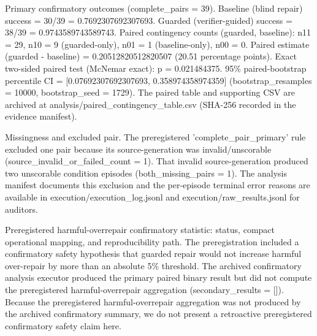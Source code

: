 \documentclass[conference]{IEEEtran}
\begin{document}
Primary confirmatory outcomes (complete\_pairs = 39). Baseline (blind repair) success = 30/39 = 0.7692307692307693. Guarded (verifier-guided) success = 38/39 = 0.9743589743589743. Paired contingency counts (guarded, baseline): n11 = 29, n10 = 9 (guarded-only), n01 = 1 (baseline-only), n00 = 0. Paired estimate (guarded - baseline) = 0.20512820512820507 (20.51 percentage points). Exact two-sided paired test (McNemar exact): p = 0.021484375. 95\% paired-bootstrap percentile CI = [0.07692307692307693, 0.358974358974359] (bootstrap\_resamples = 10000, bootstrap\_seed = 1729). The paired table and supporting CSV are archived at analysis/paired\_contingency\_table.csv (SHA-256 recorded in the evidence manifest).

Missingness and excluded pair. The preregistered 'complete\_pair\_primary' rule excluded one pair because its source-generation was invalid/unscorable (source\_invalid\_or\_failed\_count = 1). That invalid source-generation produced two unscorable condition episodes (both\_missing\_pairs = 1). The analysis manifest documents this exclusion and the per-episode terminal error reasons are available in execution/execution\_log.jsonl and execution/raw\_results.jsonl for auditors.

Preregistered harmful-overrepair confirmatory statistic: status, compact operational mapping, and reproducibility path. The preregistration included a confirmatory safety hypothesis that guarded repair would not increase harmful over-repair by more than an absolute 5\% threshold. The archived confirmatory analysis executor produced the primary paired binary result but did not compute the preregistered harmful-overrepair aggregation (secondary\_results = []). Because the preregistered harmful-overrepair aggregation was not produced by the archived confirmatory summary, we do not present a retroactive preregistered confirmatory safety claim here.
\end{document}
